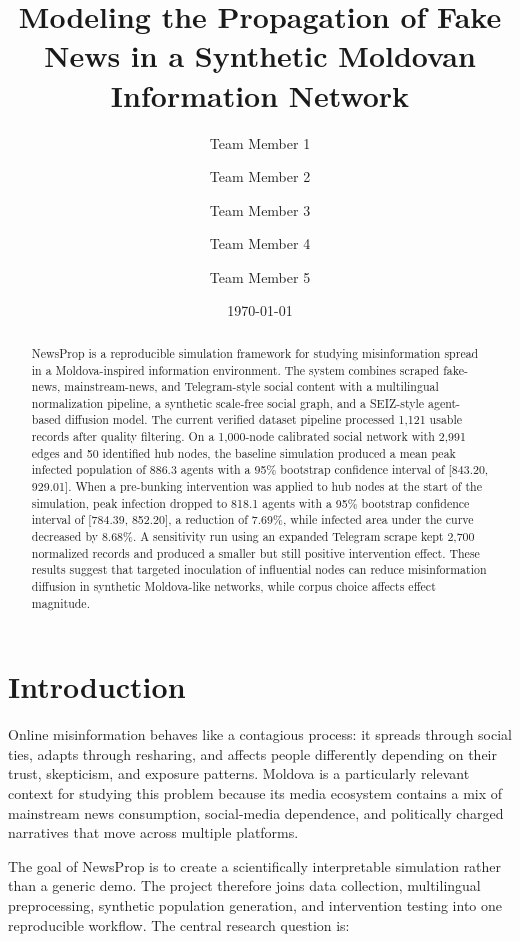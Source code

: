 \documentclass[11pt,a4paper]{article}
\title{\textbf{Modeling the Propagation of Fake News in a Synthetic Moldovan Information Network}}
\author{
  Team Member 1 \and Team Member 2 \and Team Member 3 \and Team Member 4 \and Team Member 5
}
\date{\today}
\begin{document}
\maketitle

\begin{abstract}
NewsProp is a reproducible simulation framework for studying misinformation spread in a Moldova-inspired information environment. The system combines scraped fake-news, mainstream-news, and Telegram-style social content with a multilingual normalization pipeline, a synthetic scale-free social graph, and a SEIZ-style agent-based diffusion model. The current verified dataset pipeline processed 1,121 usable records after quality filtering. On a 1,000-node calibrated social network with 2,991 edges and 50 identified hub nodes, the baseline simulation produced a mean peak infected population of 886.3 agents with a 95\% bootstrap confidence interval of [843.20, 929.01]. When a pre-bunking intervention was applied to hub nodes at the start of the simulation, peak infection dropped to 818.1 agents with a 95\% bootstrap confidence interval of [784.39, 852.20], a reduction of 7.69\%, while infected area under the curve decreased by 8.68\%. A sensitivity run using an expanded Telegram scrape kept 2,700 normalized records and produced a smaller but still positive intervention effect. These results suggest that targeted inoculation of influential nodes can reduce misinformation diffusion in synthetic Moldova-like networks, while corpus choice affects effect magnitude.
\end{abstract}

\section{Introduction}
Online misinformation behaves like a contagious process: it spreads through social ties, adapts through resharing, and affects people differently depending on their trust, skepticism, and exposure patterns. Moldova is a particularly relevant context for studying this problem because its media ecosystem contains a mix of mainstream news consumption, social-media dependence, and politically charged narratives that move across multiple platforms.

The goal of NewsProp is to create a scientifically interpretable simulation rather than a generic demo. The project therefore joins data collection, multilingual preprocessing, synthetic population generation, and intervention testing into one reproducible workflow. The central research question is:
\end{document}
